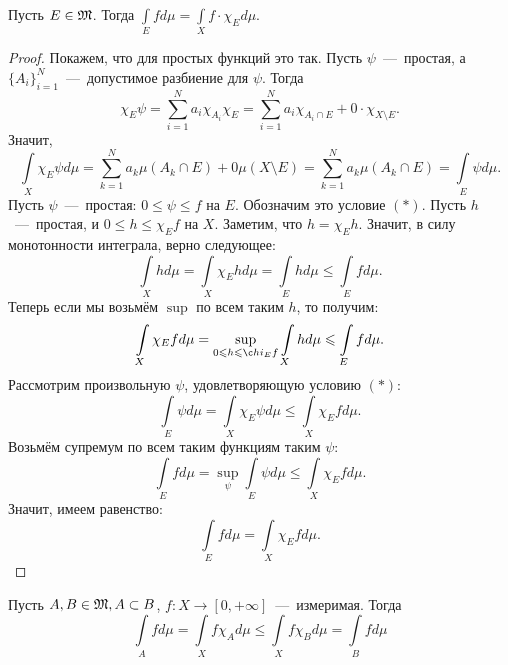 \begin{proposition}
    Пусть $E \in \mathfrak{M}$. Тогда $\int\limits_E fd\mu = \int\limits_X f \cdot\chi_Ed\mu$.
\end{proposition}
\begin{proof}
    Покажем, что для простых функций это так. Пусть $\psi$~---~простая, а $\{A_i\}_{i = 1}^N$~---~допустимое разбиение для $\psi$. Тогда \[\chi_E\psi = \sum\limits_{i = 1}^N a_i\chi_{A_i}\chi_E = \sum\limits_{i = 1}^N a_i\chi_{A_i \cap E} + 0 \cdot \chi_{X \setminus E}.\] Значит, \[\int\limits_X \chi_E \psi d\mu = \sum\limits_{k = 1}^N a_k \mu(A_k \cap E) + 0\mu(X \setminus E) = \sum\limits_{k = 1}^N a_k\mu(A_k \cap E) = \int\limits_E \psi d \mu.\]
    Пусть $\psi$~---~простая: $0 \leq \psi \leq f$ на $E$. Обозначим это условие $(*)$. Пусть $h$~---~простая, и $0 \leq h \leq \chi_E f$ на $X$.
    Заметим, что $h = \chi_E h$. Значит, в силу монотонности интеграла, верно следующее: \[\int\limits_X hd\mu = \int\limits_X \chi_E h d\mu = \int\limits_E hd\mu \leq \int\limits_E fd\mu.\]
    Теперь если мы возьмём $\sup$ по всем таким $h$, то получим:
    \[\int\limits_X \chi_E fd\mu = \sup\limits_{0\leq h \leq \c hi_E f} \int\limits_X hd\mu \leq \int\limits_E fd\mu.\]
    Рассмотрим произвольную $\psi$, удовлетворяющую условию $(*)$:
    \[\int\limits_E \psi d\mu = \int\limits_X \chi_E\psi d\mu \leq \int\limits_X \chi_E fd\mu.\]
    Возьмём супремум по всем таким функциям таким $\psi$:
    \[\int\limits_E fd\mu = \sup\limits_\psi \int\limits_E \psi d\mu \leq \int\limits_X \chi_E fd\mu.\]
    Значит, имеем равенство: \[\int\limits_E fd\mu = \int\limits_X \chi_Efd\mu.\]
\end{proof}
\begin{corollary}
    Пусть $A, B \in \mathfrak{M}, A \subset B$, $f: X \rightarrow [0, +\infty]$~---~измеримая. Тогда \[\int\limits_A fd\mu = \int\limits_X f\chi_Ad\mu \leq \int\limits_X f\chi_Bd\mu = \int\limits_B fd\mu\]
\end{corollary}

